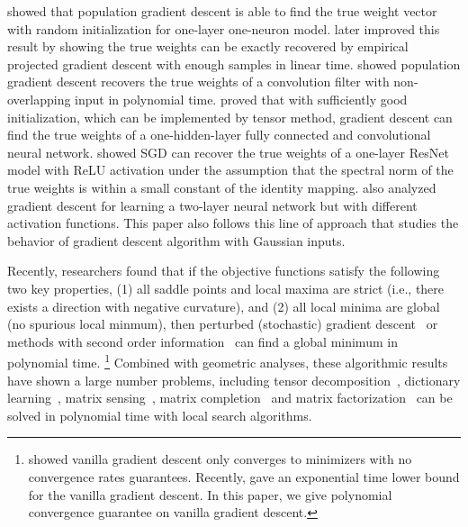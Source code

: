 \documentclass{article}
\begin{document}
\citet{tian2017analytical} showed that population gradient descent is able to find the true weight vector with random initialization for one-layer one-neuron model.
\citet{soltanolkotabi2017learning} later improved this result by showing the true weights can be exactly recovered by empirical projected gradient descent with enough samples in linear time.
\citet{brutzkus2017globally} showed population gradient descent recovers the true weights of a convolution filter with non-overlapping input in polynomial time.
\citet{zhong2017recovery,zhong2017learning} proved that with sufficiently good initialization, which can be implemented by tensor method, gradient descent can find the true weights of a one-hidden-layer fully connected and convolutional neural network.
\citet{li2017convergence} showed SGD can recover the true weights of a one-layer ResNet model with ReLU activation under the assumption that the spectral norm of the true weights is within a small constant of the identity mapping.
\cite{panigrahy2018convergence} also analyzed gradient descent for learning a two-layer neural network but with different activation functions.
This paper also follows this line of approach that studies the behavior of gradient descent algorithm with Gaussian inputs.

Recently, researchers found that if the objective functions satisfy the following two key properties, (1) all saddle points and local maxima are strict (i.e., there exists a direction with negative curvature), and (2) all local minima are global (no spurious local minmum), then perturbed (stochastic) gradient descent~\citep{ge2015escaping} or methods with second order information~\citep{carmon2016accelerated,agarwal2016finding} can find a global minimum in polynomial time.
\footnote{\citet{lee2016gradient} showed vanilla gradient descent only converges to minimizers with no convergence rates guarantees. Recently, \citet{du2017gradient} gave an exponential time lower bound for the vanilla gradient descent.
In this paper, we give polynomial convergence guarantee on vanilla gradient descent.}
Combined with geometric analyses, these algorithmic results have shown a large number problems, including tensor decomposition~\citep{ge2015escaping}, dictionary learning~\citep{sun2017complete}, matrix sensing~\citep{bhojanapalli2016global,park2017non}, matrix completion~\citep{ge2017no,ge2016matrix} and matrix factorization~\citep{li2016symmetry} can be solved in polynomial time with local search algorithms.
\end{document}
